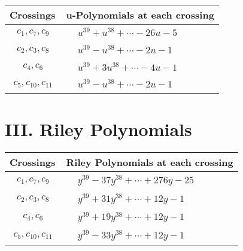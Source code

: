 \documentclass[1p]{elsarticle_modified}
\theoremstyle{definition}
\begin{document}
\begin{tabular}{m{50pt}|m{274pt}}
Crossings & \hspace{64pt}u-Polynomials at each crossing \\
\hline $$\begin{aligned}c_{1},c_{7},c_{9}\end{aligned}$$&$\begin{aligned}
&u^{39}+u^{38}+\cdots-26 u-5
\end{aligned}$\\
\hline $$\begin{aligned}c_{2},c_{3},c_{8}\end{aligned}$$&$\begin{aligned}
&u^{39}- u^{38}+\cdots-2 u-1
\end{aligned}$\\
\hline $$\begin{aligned}c_{4},c_{6}\end{aligned}$$&$\begin{aligned}
&u^{39}+3 u^{38}+\cdots-4 u-1
\end{aligned}$\\
\hline $$\begin{aligned}c_{5},c_{10},c_{11}\end{aligned}$$&$\begin{aligned}
&u^{39}- u^{38}+\cdots-2 u-1
\end{aligned}$\\
\hline
\end{tabular}\newpage\renewcommand{\arraystretch}{1}
\centering \section*{ III. Riley Polynomials}
\begin{tabular}{m{50pt}|m{274pt}}
Crossings & \hspace{64pt}Riley Polynomials at each crossing \\
\hline $$\begin{aligned}c_{1},c_{7},c_{9}\end{aligned}$$&$\begin{aligned}
&y^{39}-37 y^{38}+\cdots+276 y-25
\end{aligned}$\\
\hline $$\begin{aligned}c_{2},c_{3},c_{8}\end{aligned}$$&$\begin{aligned}
&y^{39}+31 y^{38}+\cdots+12 y-1
\end{aligned}$\\
\hline $$\begin{aligned}c_{4},c_{6}\end{aligned}$$&$\begin{aligned}
&y^{39}+19 y^{38}+\cdots+12 y-1
\end{aligned}$\\
\hline $$\begin{aligned}c_{5},c_{10},c_{11}\end{aligned}$$&$\begin{aligned}
&y^{39}-33 y^{38}+\cdots+12 y-1
\end{aligned}$\\
\hline
\end{tabular}
\vskip 2pc
\end{document}
